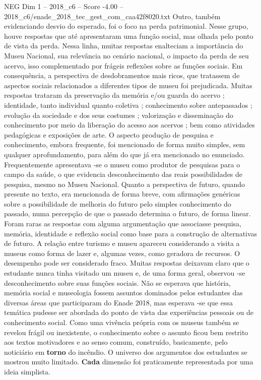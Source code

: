\begin{textsample}{NEG Dim 1 – 2018\_c6 – Score -4.00 – 2018\_c6/enade\_2018\_tec\_gest\_com\_caa42f8020.txt}
Outro, também evidenciando desvio do esperado, foi o foco na perda patrimonial.
Nesse grupo, houve respostas que até apresentaram uma função social, mas olhada pelo ponto de vista da perda.
Nessa linha, muitas respostas enalteciam a importância do Museu Nacional, sua relevância no cenário nacional, o impacto da perda de seu acervo, isso complementado por frágeis reflexões sobre as funções sociais.
Em consequência, a perspectiva de desdobramentos mais ricos, que tratassem de aspectos sociais relacionados a diferentes tipos de museu foi prejudicada.
Muitas respostas trataram da preservação da memória e/ou guarda do acervo ; identidade, tanto individual quanto coletiva ; conhecimento sobre antepassados ; evolução da sociedade e dos seus costumes ; valorização e disseminação do conhecimento por meio da liberação do acesso aos acervos ; bem como atividades pedagógicas e exposições de arte.
O aspecto produção de pesquisa e conhecimento, embora frequente, foi mencionado de forma muito simples, sem qualquer aprofundamento, para além do que já era mencionado no enunciado.
Frequentemente apresentava -se o museu como produtor de pesquisas para o campo da saúde, o que evidencia desconhecimento das reais possibilidades de pesquisa, mesmo no Museu Nacional.
Quanto a perspectiva de futuro, quando presente no texto, era mencionada de forma breve, com afirmações genéricas sobre a possibilidade de melhoria do futuro pelo simples conhecimento do passado, numa percepção de que o passado determina o futuro, de forma linear.
Foram raras as respostas com alguma argumentação que associasse pesquisa, memória, identidade e reflexão social como base para a construção de alternativas de futuro.
A relação entre turismo e museu apareceu considerando a visita a museus como forma de lazer e, algumas vezes, como geradora de recursos.
O desempenho pode ser considerado fraco.
Muitas respostas deixavam claro que o estudante nunca tinha visitado um museu e, de uma forma geral, observou -se desconhecimento sobre suas funções sociais.
Não se esperava que história, memória social e museologia fossem assuntos dominados pelos estudantes das diversas áreas que participaram do Enade 2018, mas esperava -se que essa temática pudesse ser abordada do ponto de vista das experiências pessoais ou de conhecimento social.
Como uma vivência própria com os museus também se revelou frágil ou inexistente, o conhecimento sobre o assunto ficou bem restrito aos textos motivadores e ao senso comum, construído, basicamente, pelo noticiário em \textbf{torno} do incêndio.
O universo dos argumentos dos estudantes se mostrou muito limitado. \textbf{Cada} dimensão foi praticamente representada por uma ideia simplista.

\end{textsample}
